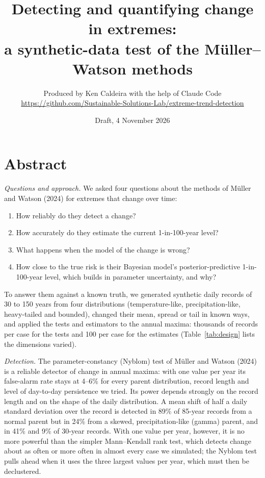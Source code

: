 \documentclass[11pt]{article}
\title{\vspace{-3.2em}Detecting and quantifying change in extremes:\\a synthetic-data test of the M\"uller--Watson methods}
\author{Produced by Ken Caldeira with the help of Claude Code \\ \small\url{https://github.com/Sustainable-Solutions-Lab/extreme-trend-detection}}
\date{Draft, 4 November 2026}
\begin{document}
\maketitle
\vspace{-2.5em}

\section*{Abstract}

\emph{Questions and approach.} We asked four questions about the methods of M\"uller and Watson
(2024) for extremes that change over time:
\vspace{-0.6\baselineskip}
\begin{enumerate}\setlength{\itemsep}{0pt}\setlength{\parskip}{0pt}
\item How reliably do they detect a change?
\item How accurately do they estimate the current 1-in-100-year level?
\item What happens when the model of the change is wrong?
\item How close to the true risk is their Bayesian model's posterior-predictive 1-in-100-year
  level, which builds in parameter uncertainty, and why?
\end{enumerate}
\vspace{-0.4\baselineskip}
\noindent To answer them against a known truth, we generated synthetic daily records of 30 to 150 years from
four distributions (temperature-like, precipitation-like, heavy-tailed and bounded), changed their
mean, spread or tail in known ways, and applied the tests and estimators to the annual maxima:
thousands of records per case for the tests and 100 per case for the estimates
(Table~\ref{tab:design} lists the dimensions varied).

\emph{Detection.} The parameter-constancy (Nyblom) test of M\"uller and Watson (2024) is a reliable
detector of change in annual maxima: with one value per year its false-alarm rate stays at
4--6\% for every parent distribution, record length and level of day-to-day persistence we tried.
Its power depends strongly on the record length and on the shape of the daily distribution. A
mean shift of half a daily standard deviation over the record is detected in 89\% of 85-year
records from a normal parent but in 24\% from a skewed, precipitation-like (gamma) parent, and in
41\% and 9\% of 30-year records. With one value per year, however, it is no more powerful than the
simpler Mann--Kendall rank test, which detects change about as often or more often in almost every
case we simulated; the Nyblom test pulls ahead when it uses the three largest values per year, which
must then be declustered.
\end{document}
